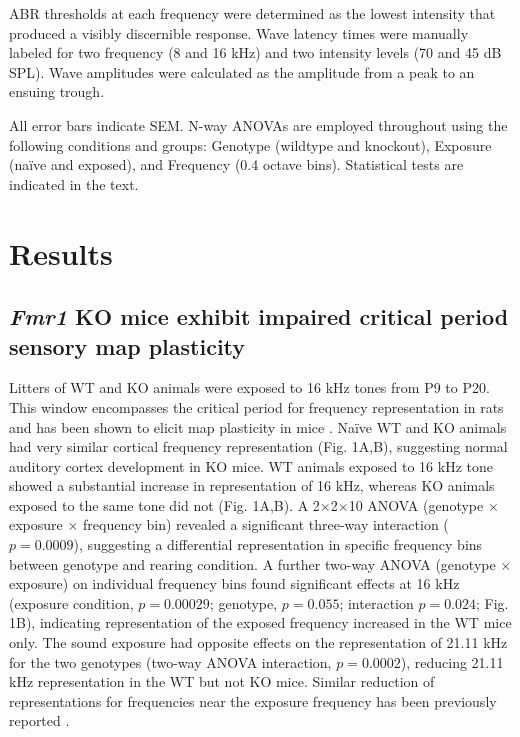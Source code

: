 ABR thresholds at each frequency were determined as the lowest intensity that produced a visibly discernible response. Wave latency times were manually labeled for two frequency (8 and 16 kHz) and two intensity levels (70 and 45 dB SPL). Wave amplitudes were calculated as the amplitude from a peak to an ensuing trough.

All error bars indicate SEM. N-way ANOVAs are employed throughout using the following conditions and groups: Genotype (wildtype and knockout), Exposure (na\"ive and exposed), and Frequency (0.4 octave bins). Statistical tests are indicated in the text.

\section{Results}

\subsection{\textit{Fmr1} KO mice exhibit impaired critical period sensory map plasticity}

Litters of WT and KO animals were exposed to 16 kHz tones from P9 to P20. This window encompasses the critical period for frequency representation in rats \cite{DeVillers-Sidani2007, Insanally2009} and has been shown to elicit map plasticity in mice \cite{Barkat2011}. Na\"ive WT and KO animals had very similar cortical frequency representation (Fig. 1A,B), suggesting normal auditory cortex development in KO mice. WT animals exposed to 16 kHz tone showed a substantial increase in representation of 16 kHz, whereas KO animals exposed to the same tone did not (Fig. 1A,B). A 2$\times$2$\times$10 ANOVA (genotype $\times$ exposure $\times$ frequency bin) revealed a significant three-way interaction ($p=0.0009$), suggesting a differential representation in specific frequency bins between genotype and rearing condition. A further two-way ANOVA (genotype $\times$ exposure) on individual frequency bins found significant effects at 16 kHz (exposure condition, $p=0.00029$; genotype, $p=0.055$; interaction $p=0.024$; Fig. 1B), indicating representation of the exposed frequency increased in the WT mice only. The sound exposure had opposite effects on the representation of 21.11 kHz for the two genotypes (two-way ANOVA interaction, $p=0.0002$), reducing 21.11 kHz representation in the WT but not KO mice. Similar reduction of representations for frequencies near the exposure frequency has been previously reported \cite{Han2007}.

